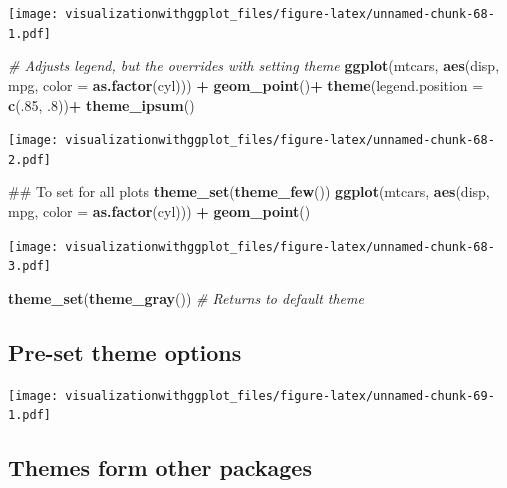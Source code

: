 \documentclass[]{krantz}
\makeatletter
\newenvironment{Shaded}{\begin{snugshade}}{\end{snugshade}}
\newcommand{\KeywordTok}[1]{\textcolor[rgb]{0.13,0.29,0.53}{\textbf{#1}}}
\newcommand{\DataTypeTok}[1]{\textcolor[rgb]{0.13,0.29,0.53}{#1}}
\newcommand{\DecValTok}[1]{\textcolor[rgb]{0.00,0.00,0.81}{#1}}
\newcommand{\StringTok}[1]{\textcolor[rgb]{0.31,0.60,0.02}{#1}}
\newcommand{\CommentTok}[1]{\textcolor[rgb]{0.56,0.35,0.01}{\textit{#1}}}
\newcommand{\OperatorTok}[1]{\textcolor[rgb]{0.81,0.36,0.00}{\textbf{#1}}}
\newcommand{\NormalTok}[1]{#1}
\newenvironment{kframe}{%
\medskip{}
\setlength{\fboxsep}{.8em}
 \def\at@end@of@kframe{}%
 \ifinner\ifhmode%
  \def\at@end@of@kframe{\end{minipage}}%
  \begin{minipage}{\columnwidth}%
 \fi\fi%
 \def\FrameCommand##1{\hskip\@totalleftmargin \hskip-\fboxsep
 \colorbox{shadecolor}{##1}\hskip-\fboxsep
     \hskip-\linewidth \hskip-\@totalleftmargin \hskip\columnwidth}%
 \MakeFramed {\advance\hsize-\width
   \@totalleftmargin\z@ \linewidth\hsize
   \@setminipage}}%
 {\par\unskip\endMakeFramed%
 \at@end@of@kframe}
\renewenvironment{Shaded}{\begin{kframe}}{\end{kframe}}
\theoremstyle{definition}
\theoremstyle{definition}
\theoremstyle{definition}
\theoremstyle{remark}
\makeatother
\begin{document}
\texttt{[image: visualizationwithggplot\_files/figure-latex/unnamed-chunk-68-1.pdf]}

\begin{Shaded}
\begin{Highlighting}[]
\CommentTok{# Adjusts legend, but the overrides with setting theme }
\KeywordTok{ggplot}\NormalTok{(mtcars, }\KeywordTok{aes}\NormalTok{(disp,  mpg, }\DataTypeTok{color =} \KeywordTok{as.factor}\NormalTok{(cyl))) }\OperatorTok{+}\StringTok{ }\KeywordTok{geom_point}\NormalTok{()}\OperatorTok{+}\StringTok{ }
\StringTok{  }\KeywordTok{theme}\NormalTok{(}\DataTypeTok{legend.position =} \KeywordTok{c}\NormalTok{(.}\DecValTok{85}\NormalTok{, .}\DecValTok{8}\NormalTok{))}\OperatorTok{+}
\StringTok{  }\KeywordTok{theme_ipsum}\NormalTok{()}
\end{Highlighting}
\end{Shaded}

\texttt{[image: visualizationwithggplot\_files/figure-latex/unnamed-chunk-68-2.pdf]}

\begin{Shaded}
\begin{Highlighting}[]
\NormalTok{## To set for all plots}
\KeywordTok{theme_set}\NormalTok{(}\KeywordTok{theme_few}\NormalTok{())}
\KeywordTok{ggplot}\NormalTok{(mtcars, }\KeywordTok{aes}\NormalTok{(disp,  mpg, }\DataTypeTok{color =} \KeywordTok{as.factor}\NormalTok{(cyl))) }\OperatorTok{+}\StringTok{ }\KeywordTok{geom_point}\NormalTok{()}
\end{Highlighting}
\end{Shaded}

\texttt{[image: visualizationwithggplot\_files/figure-latex/unnamed-chunk-68-3.pdf]}

\begin{Shaded}
\begin{Highlighting}[]
\KeywordTok{theme_set}\NormalTok{(}\KeywordTok{theme_gray}\NormalTok{()) }\CommentTok{# Returns to default theme}
\end{Highlighting}
\end{Shaded}

\subsection{Pre-set theme options}\label{pre-set-theme-options}

\texttt{[image: visualizationwithggplot\_files/figure-latex/unnamed-chunk-69-1.pdf]}

\subsection{Themes form other
packages}\label{themes-form-other-packages}
\end{document}
